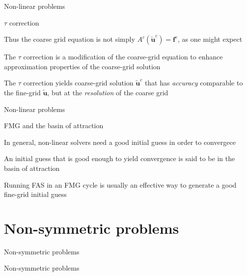 \documentclass[18pt,xcolor=table]{beamer}
\begin{document}
\begin{frame}{Non-linear problems}
\begin{block}{$\tau$ correction}
\bit
\item Thus the coarse grid equation is not simply $A^c(\mathbf{\tilde{u}}^c) = \mathbf{f}^c$, as one might expect
\item The $\tau$ correction is a modification of the coarse-grid equation to enhance approximation properties of the coarse-grid solution
\item The $\tau$ correction yields coarse-grid solution $\mathbf{\tilde{u}}^c$ that has \emph{accuracy} comparable to the fine-grid $\mathbf{\tilde{u}}$, but at the \emph{resolution} of the coarse grid
\eit
\end{block}
\end{frame}

\begin{frame}{Non-linear problems}
\begin{block}{FMG and the basin of attraction}
\bit
\item In general, non-linear solvers need a good initial guess in order to convergece
\item An initial guess that is good enough to yield convergence is said to be in the basin of attraction
\item Running FAS in an FMG cycle is usually an effective way to generate a good fine-grid initial guess
\eit
\end{block}
\end{frame}


\section{Non-symmetric problems}

\begin{frame}{Non-symmetric problems}
\begin{block}{}
\bit
\item 
\eit
\end{block}
\end{frame}

\begin{frame}{Non-symmetric problems}
\begin{block}{}
\bit
\item 
\eit
\end{block}
\end{frame}
\end{document}
